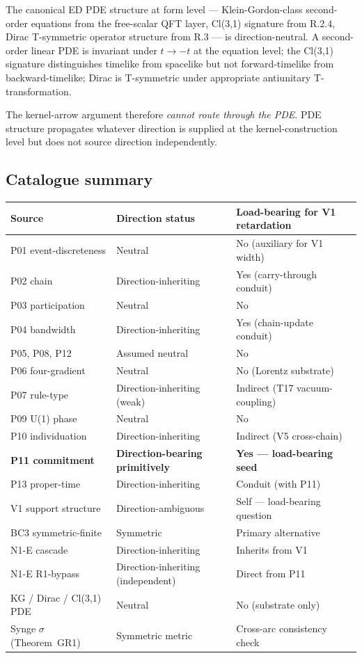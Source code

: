 \documentclass[11pt,a4paper]{article}
\begin{document}
The canonical ED PDE structure at form level --- Klein-Gordon-class second-order equations from the free-scalar QFT layer, Cl(3,1) signature from R.2.4, Dirac T-symmetric operator structure from R.3 --- is direction-neutral. A second-order linear PDE is invariant under $t \to -t$ at the equation level; the Cl(3,1) signature distinguishes timelike from spacelike but not forward-timelike from backward-timelike; Dirac is T-symmetric under appropriate antiunitary T-transformation.

The kernel-arrow argument therefore \emph{cannot route through the PDE}. PDE structure propagates whatever direction is supplied at the kernel-construction level but does not source direction independently.

\subsection{Catalogue summary}

\begin{longtable}{p{} p{} p{}}
\toprule
\textbf{Source} & \textbf{Direction status} & \textbf{Load-bearing for V1 retardation} \\
\midrule
\endhead
P01 event-discreteness & Neutral & No (auxiliary for V1 width) \\
P02 chain & Direction-inheriting & Yes (carry-through conduit) \\
P03 participation & Neutral & No \\
P04 bandwidth & Direction-inheriting & Yes (chain-update conduit) \\
P05, P08, P12 & Assumed neutral & No \\
P06 four-gradient & Neutral & No (Lorentz substrate) \\
P07 rule-type & Direction-inheriting (weak) & Indirect (T17 vacuum-coupling) \\
P09 U(1) phase & Neutral & No \\
P10 individuation & Direction-inheriting & Indirect (V5 cross-chain) \\
\textbf{P11 commitment} & \textbf{Direction-bearing primitively} & \textbf{Yes --- load-bearing seed} \\
P13 proper-time & Direction-inheriting & Conduit (with P11) \\
V1 support structure & Direction-ambiguous & Self --- load-bearing question \\
BC3 symmetric-finite & Symmetric & Primary alternative \\
N1-E cascade & Direction-inheriting & Inherits from V1 \\
N1-E R1-bypass & Direction-inheriting (independent) & Direct from P11 \\
KG / Dirac / Cl(3,1) PDE & Neutral & No (substrate only) \\
Synge $\sigma$ (Theorem~GR1) & Symmetric metric & Cross-arc consistency check \\
\bottomrule
\end{longtable}
\end{document}

